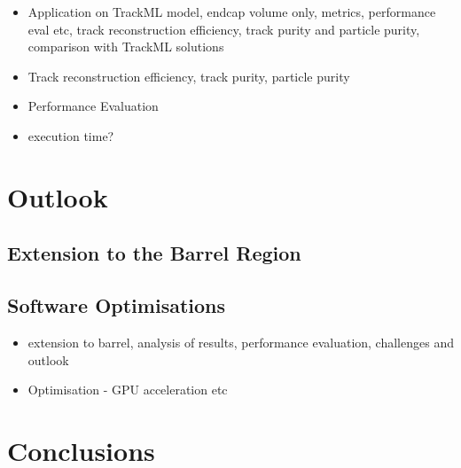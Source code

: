 \begin{itemize}
    \item Application on TrackML model, endcap volume only, metrics, performance eval etc, track reconstruction efficiency, track purity and particle purity, comparison with TrackML solutions
    \item Track reconstruction efficiency, track purity, particle purity
    \item Performance Evaluation
    \item execution time?
\end{itemize}

\section{Outlook}

\subsection{Extension to the Barrel Region}

\subsection{Software Optimisations}

\begin{itemize}
    \item extension to barrel, analysis of results, performance  evaluation, challenges and outlook
    \item Optimisation - GPU acceleration etc
\end{itemize}


\section{Conclusions}